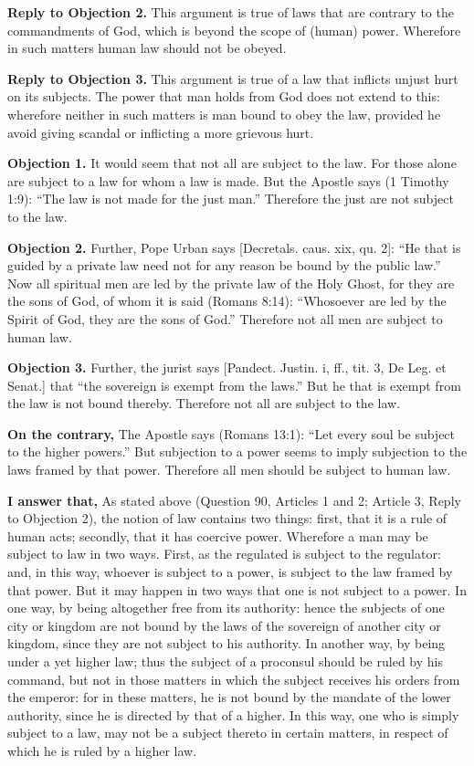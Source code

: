 \textbf{Reply to Objection 2.} This argument is true of laws that are contrary to the commandments of God, which is beyond the scope of (human) power. Wherefore in such matters human law should not be obeyed.

\textbf{Reply to Objection 3.} This argument is true of a law that inflicts unjust hurt on its subjects. The power that man holds from God does not extend to this: wherefore neither in such matters is man bound to obey the law, provided he avoid giving scandal or inflicting a more grievous hurt.


\textbf{Objection 1.} It would seem that not all are subject to the law. For those alone are subject to a law for whom a law is made. But the Apostle says (1 Timothy 1:9): ``The law is not made for the just man.'' Therefore the just are not subject to the law.

\textbf{Objection 2.} Further, Pope Urban says [Decretals. caus. xix, qu. 2]: ``He that is guided by a private law need not for any reason be bound by the public law.'' Now all spiritual men are led by the private law of the Holy Ghost, for they are the sons of God, of whom it is said (Romans 8:14): ``Whosoever are led by the Spirit of God, they are the sons of God.'' Therefore not all men are subject to human law.

\textbf{Objection 3.} Further, the jurist says [Pandect. Justin. i, ff., tit. 3, De Leg. et Senat.] that ``the sovereign is exempt from the laws.'' But he that is exempt from the law is not bound thereby. Therefore not all are subject to the law.

\textbf{On the contrary,} The Apostle says (Romans 13:1): ``Let every soul be subject to the higher powers.'' But subjection to a power seems to imply subjection to the laws framed by that power. Therefore all men should be subject to human law.

\textbf{I answer that,} As stated above (Question 90, Articles 1 and 2; Article 3, Reply to Objection 2), the notion of law contains two things: first, that it is a rule of human acts; secondly, that it has coercive power. Wherefore a man may be subject to law in two ways. First, as the regulated is subject to the regulator: and, in this way, whoever is subject to a power, is subject to the law framed by that power. But it may happen in two ways that one is not subject to a power. In one way, by being altogether free from its authority: hence the subjects of one city or kingdom are not bound by the laws of the sovereign of another city or kingdom, since they are not subject to his authority. In another way, by being under a yet higher law; thus the subject of a proconsul should be ruled by his command, but not in those matters in which the subject receives his orders from the emperor: for in these matters, he is not bound by the mandate of the lower authority, since he is directed by that of a higher. In this way, one who is simply subject to a law, may not be a subject thereto in certain matters, in respect of which he is ruled by a higher law.

